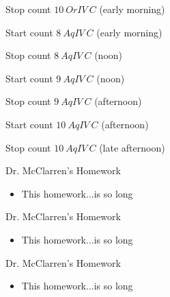 \documentclass[idxtotoc,hyperref,openany,oneside]{labbook} %
\newcommand{\cmark}{\ding{51}}%
\newcommand{\done}{\rlap{$\square$}{\raisebox{2pt}{\large\hspace{1pt}\cmark}}%
  \hspace{-2.5pt}}
\begin{document}


\begin{todolist}
\item[\done]{Stop count $\boxed{10\ OrIV\ C}$ (early morning)}
\item[\done]{Start count $\boxed{8\ AqIV\ C}$ (early morning)}
\item[\done]{Stop count $\boxed{8\ AqIV\ C}$ (noon)}
\item[\done]{Start count $\boxed{9\ AqIV\ C}$ (noon)}
\item[\done]{Stop count $\boxed{9\ AqIV\ C}$ (afternoon)}
\item[\done]{Start count $\boxed{10\ AqIV\ C}$ (afternoon)}
\item[\done]{Stop count $\boxed{10\ AqIV\ C}$ (late afternoon)}
\end{todolist}



\begin{todolist}
\item{Dr. McClarren's Homework}
  \begin{itemize}
  \item{This homework...is so long}
  \end{itemize}
\end{todolist}





\begin{todolist}
\item{Dr. McClarren's Homework}
  \begin{itemize}
  \item{This homework...is so long}
  \end{itemize}
\end{todolist}





\begin{todolist}
\item{Dr. McClarren's Homework}
  \begin{itemize}
  \item{This homework...is so long}
  \end{itemize}
\end{todolist}
\end{document}
